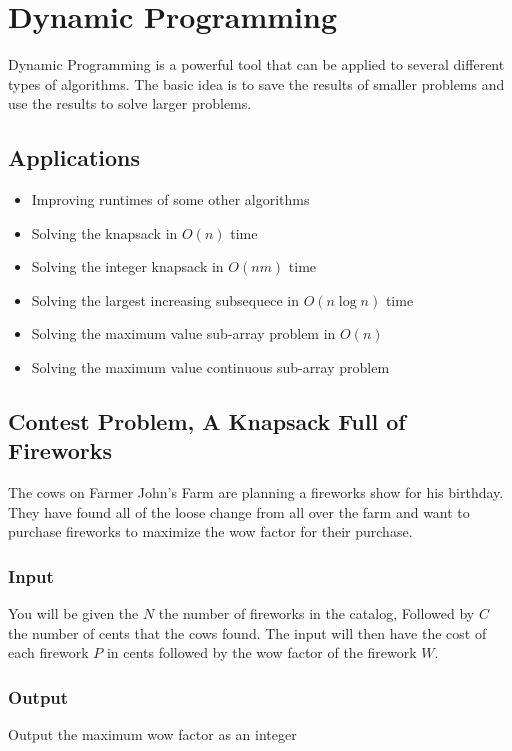 \section{Dynamic Programming}
Dynamic Programming is a powerful tool that can be applied to several different types of algorithms.\cite{dppractice}
The basic idea is to save the results of smaller problems and use the results to solve larger problems.

\subsection{Applications}
\begin{itemize}
	\item	Improving runtimes of some other algorithms
	\item	Solving the knapsack in $O(n)$ time
	\item	Solving the integer knapsack in $O(nm)$ time
	\item	Solving the largest increasing subsequece in $O(n \log n)$ time
	\item	Solving the maximum value sub-array problem in $O(n)$
	\item	Solving the maximum value continuous sub-array problem
\end{itemize}

\subsection{Contest Problem, A Knapsack Full of Fireworks}
The cows on Farmer John's Farm are planning a fireworks show for his birthday.
They have found all of the loose change from all over the farm and want to purchase fireworks to maximize the wow factor for their purchase.

\subsubsection{Input}
You will be given the $N$ the number of fireworks in the catalog,
Followed by $C$ the number of cents that the cows found.
The input will then have the cost of each firework $P$ in cents followed by the wow factor of the firework $W$.

\subsubsection{Output}
Output the maximum wow factor as an integer

